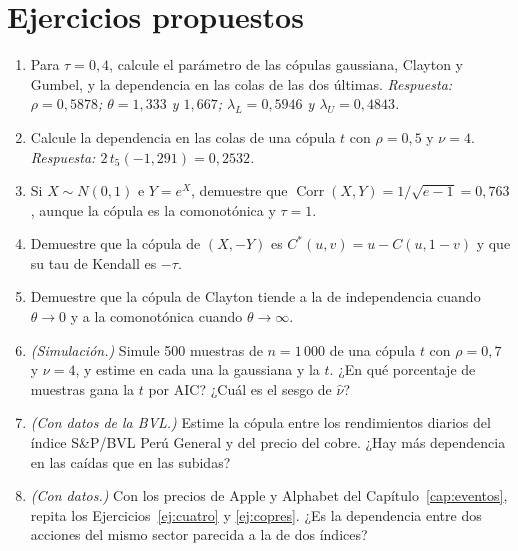 \section{Ejercicios propuestos}

\begin{enumerate}[label=\textbf{\thechapter.\arabic*},leftmargin=*,itemsep=6pt]
  \item Para $\tau=0{,}4$, calcule el parámetro de las cópulas gaussiana, Clayton y Gumbel, y la dependencia en las colas de
  las dos últimas. \textit{Respuesta: $\rho=0{,}5878$; $\theta=1{,}333$ y $1{,}667$; $\lambda_L=0{,}5946$ y $\lambda_U=0{,}4843$.}

  \item Calcule la dependencia en las colas de una cópula $t$ con $\rho=0{,}5$ y $\nu=4$. \textit{Respuesta: $2\,t_5(-1{,}291)=0{,}2532$.}

  \item Si $X\sim N(0,1)$ e $Y=e^X$, demuestre que $\operatorname{Corr}(X,Y)=1/\sqrt{e-1}=0{,}763$, aunque la cópula es la comonotónica y
  $\tau=1$.

  \item Demuestre que la cópula de $(X,-Y)$ es $C^*(u,v)=u-C(u,1-v)$ y que su tau de Kendall es $-\tau$.

  \item Demuestre que la cópula de Clayton tiende a la de independencia cuando $\theta\to0$ y a la comonotónica cuando
  $\theta\to\infty$.

  \item \emph{(Simulación.)} Simule 500 muestras de $n=1\,000$ de una cópula $t$ con $\rho=0{,}7$ y $\nu=4$, y estime en cada una la
  gaussiana y la $t$. ¿En qué porcentaje de muestras gana la $t$ por AIC? ¿Cuál es el sesgo de $\hat\nu$?

  \item \emph{(Con datos de la BVL.)} Estime la cópula entre los rendimientos diarios del índice S\&P/BVL Perú General y del
  precio del cobre. ¿Hay más dependencia en las caídas que en las subidas?

  \item \emph{(Con datos.)} Con los precios de Apple y Alphabet del Capítulo~\ref{cap:eventos}, repita los
  Ejercicios~\ref{ej:cuatro} y \ref{ej:copres}. ¿Es la dependencia entre dos acciones del mismo sector parecida a la de dos índices?
\end{enumerate}

